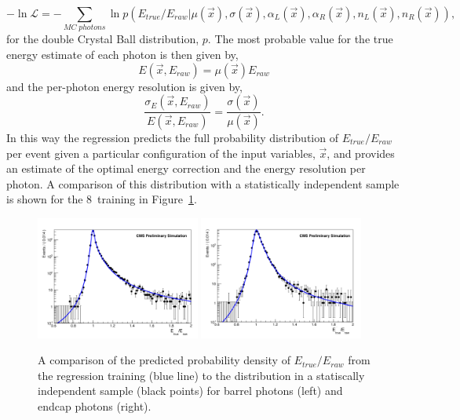 \begin{equation}
  -\ln \mathcal{L} = - \sum_{MC \; photons} \ln p(E_{true}/E_{raw} | \mu(\vec{x}),\sigma(\vec{x}),\alpha_{L}(\vec{x}),\alpha_{R}(\vec{x}),n_{L}(\vec{x}),n_{R}(\vec{x})),
\end{equation}
for the double Crystal Ball distribution, $p$. The most probable value for the true energy estimate of each photon is then given by,
\begin{equation}
  E(\vec{x},E_{raw}) = \mu(\vec{x})E_{raw}
\end{equation}
and the per-photon energy resolution is given by, 
\begin{equation}
  \frac{\sigma_{E}(\vec{x},E_{raw})}{E(\vec{x},E_{raw})} = \frac{\sigma(\vec{x})}{\mu(\vec{x})}.
\end{equation}
In this way the regression predicts the full probability distribution of $E_{true}/E_{raw}$ per event given a particular configuration of the input variables, $\vec{x}$, and provides an estimate of the optimal energy correction and the energy resolution per photon. A comparison of this distribution with a statistically independent \MC sample is shown for the 8~\TeV training in Figure~\ref{fig:regression_training}. 

\begin{figure}
  \includegraphics[width=0.48\textwidth]{analysis_comps/plots/regression_barrel_fix.pdf}
  \includegraphics[width=0.48\textwidth]{analysis_comps/plots/regression_endcap_fix.pdf}
  \caption[A comparison of the predicted probability density of $E_{true}/E_{raw}$ from the regression training to the distribution in a statistically independent sample]{A comparison of the predicted probability density of $E_{true}/E_{raw}$ from the regression training (blue line) to the distribution in a statiscally independent \MC sample (black points) for barrel photons (left) and endcap photons (right).}
  \label{fig:regression_training}
\end{figure}

